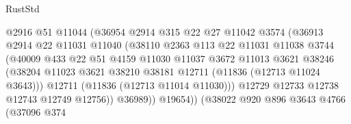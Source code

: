 \begin{lexlean}{RustStd}
\begin{coremodule}
                                  @2916
                                  @51
                                  @11044
                                  (@36954
                                    @2914
                                    @315
                                    @22
                                    @27
                                    @11042
                                    @3574
                                    (@36913
                                      @2914
                                      @22
                                      @11031
                                      @11040
                                      (@38110
                                        @2363
                                        @113
                                        @22
                                        @11031
                                        @11038
                                        @3744
                                        (@40009
                                          @433
                                          @22
                                          @51
                                          @4159
                                          @11030
                                          @11037
                                          @3672
                                          @11013
                                          @3621
                                          @38246
                                          (@38204
                                            @11023
                                            @3621
                                            @38210
                                            @38181
                                            @12711
                                            (@11836 (@12713 @11024 @3643)))
                                          @12711
                                          (@11836 (@12713 @11014 @11030)))
                                        @12729
                                        @12733
                                        @12738
                                        @12743
                                        @12749
                                        @12756))
                                    @36989))
                                @19654))
                            (@38022
                              @920
                              @896
                              @3643
                              @4766
                              (@37096
                                @374

\end{coremodule}
\end{lexlean}
